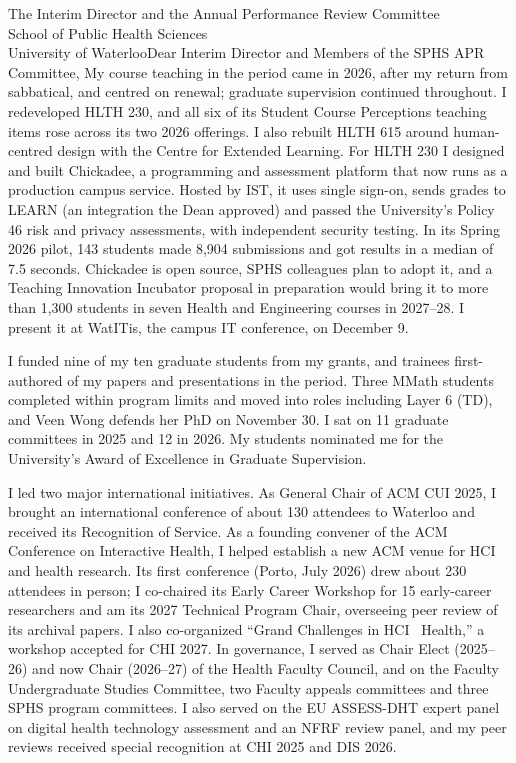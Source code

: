 \begin{aprletter}{%
The Interim Director and the Annual Performance Review Committee\\
School of Public Health Sciences\\
University of Waterloo}{Dear Interim Director and Members of the SPHS APR Committee,}
My course teaching in the period came in 2026, after my return from sabbatical, and centred on renewal; graduate supervision continued throughout. I redeveloped HLTH 230, and all six of its Student Course Perceptions teaching items rose across its two 2026 offerings. I also rebuilt HLTH 615 around human-centred design with the Centre for Extended Learning. For HLTH 230 I designed and built Chickadee, a programming and assessment platform that now runs as a production campus service. Hosted by IST, it uses single sign-on, sends grades to LEARN (an integration the Dean approved) and passed the University's Policy 46 risk and privacy assessments, with independent security testing. In its Spring 2026 pilot, 143 students made 8,904 submissions and got results in a median of 7.5 seconds. Chickadee is open source, SPHS colleagues plan to adopt it, and a Teaching Innovation Incubator proposal in preparation would bring it to more than 1,300 students in seven Health and Engineering courses in 2027--28. I present it at WatITis, the campus IT conference, on December 9.


I funded nine of my ten graduate students from my grants, and trainees first-authored  of my  papers and presentations in the period. Three MMath students completed within program limits and moved into roles including Layer 6 (TD), and Veen Wong defends her PhD on November 30. I sat on 11 graduate committees in 2025 and 12 in 2026. My students nominated me for the University's Award of Excellence in Graduate Supervision.


I led two major international initiatives. As General Chair of ACM CUI 2025, I brought an international conference of about 130 attendees to Waterloo and received its Recognition of Service. As a founding convener of the ACM Conference on Interactive Health, I helped establish a new ACM venue for HCI and health research. Its first conference (Porto, July 2026) drew about 230 attendees in person; I co-chaired its Early Career Workshop for 15 early-career researchers and am its 2027 Technical Program Chair, overseeing peer review of its archival papers. I also co-organized ``Grand Challenges in HCI~\texttimes{} Health,'' a workshop accepted for CHI 2027. In governance, I served as Chair Elect (2025--26) and now Chair (2026--27) of the Health Faculty Council, and on the Faculty Undergraduate Studies Committee, two Faculty appeals committees and three SPHS program committees. I also served on the EU ASSESS-DHT expert panel on digital health technology assessment and an NFRF review panel, and my peer reviews received special recognition at CHI 2025 and DIS 2026.


\end{aprletter}
